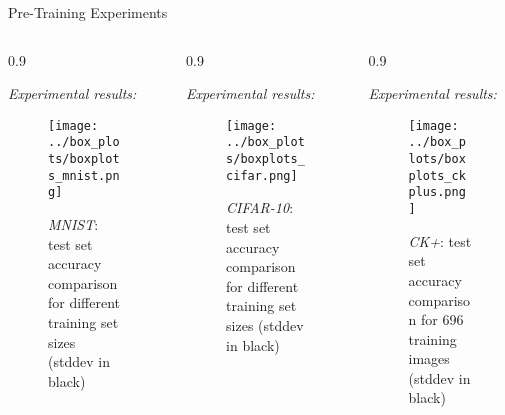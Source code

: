 \documentclass[final]{beamer}
\newlength{\onecolwid}
\newlength{\threecolwid}
\begin{document}
\begin{frame}[t]
\begin{columns}[t]
\begin{column}{\threecolwid}
\begin{alertblock}{Pre-Training Experiments}
\begin{columns}[t, totalwidth=0.9\threecolwid]
	\begin{column}{0.9\onecolwid} %
	\begin{block}{}
	\emph{Experimental results:}

	\begin{figure}
	\texttt{[image: ../box\_plots/boxplots\_mnist.png]}
	\caption{\emph{MNIST}: test set accuracy comparison for different training set sizes (stddev in black)}
	\label{fig:mnist_plot}
	\end{figure}

	\end{block}
	\end{column}
	\begin{column}{0.9\onecolwid}
	\begin{block}{}
	\emph{Experimental results:}

	\begin{figure}
	\texttt{[image: ../box\_plots/boxplots\_cifar.png]}
	\caption{\emph{CIFAR-10}: test set accuracy comparison for different training set sizes (stddev in black)}
	\label{fig:cifar_plot}
	\end{figure}

	\end{block}
	\end{column}

	\begin{column}{0.9\onecolwid}
	\begin{block}{}
	\emph{Experimental results:}

	\begin{figure}
	\centering
	\texttt{[image: ../box\_plots/boxplots\_ckplus.png]}
	\caption{\emph{CK+}: test set accuracy comparison for 696 training images (stddev in black)}
	\label{fig:ckplus_plot}
	\end{figure}

	\end{block}



	\end{column}
\end{columns}



\end{alertblock}
\end{column}
\end{columns}
\end{frame}
\end{document}
